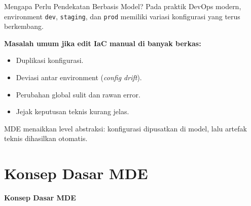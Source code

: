 \documentclass[aspectratio=169, table]{beamer}
\begin{document}
\begin{frame}{Mengapa Perlu Pendekatan Berbasis Model?}
\vspace{8pt}
Pada praktik DevOps modern, environment \texttt{dev}, \texttt{staging}, dan \texttt{prod}
memiliki variasi konfigurasi yang terus berkembang.

\vspace{8pt}
\textbf{Masalah umum jika edit IaC manual di banyak berkas:}
\begin{itemize}
  \item Duplikasi konfigurasi.
  \item Deviasi antar environment (\textit{config drift}).
  \item Perubahan global sulit dan rawan error.
  \item Jejak keputusan teknis kurang jelas.
\end{itemize}

\vspace{6pt}
MDE menaikkan level abstraksi: konfigurasi dipusatkan di model,
lalu artefak teknis dihasilkan otomatis.
\end{frame}

\section{Konsep Dasar MDE}
\begin{frame}{\hfill}
	\centering
	\Huge{\textbf{Konsep Dasar MDE}}
\end{frame}
\end{document}
